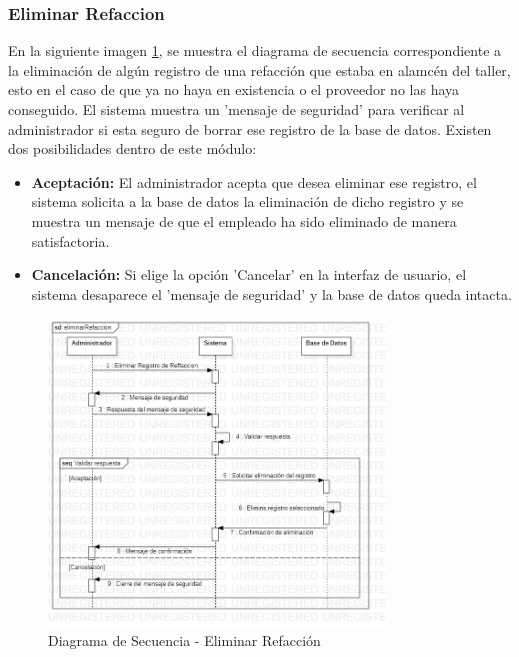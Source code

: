 \subsubsection{Eliminar Refaccion}
En la siguiente imagen \ref{fig:Diagrama de Secuencia - Eliminar Refaccion}, se muestra el diagrama de secuencia correspondiente a la eliminación de algún registro de una refacción que estaba en alamcén del taller, esto en el caso de que ya no haya en existencia o el proveedor no las haya conseguido. El sistema muestra un 'mensaje de seguridad' para verificar al administrador si esta seguro de borrar ese registro de la base de datos. Existen dos posibilidades dentro de este módulo:
\begin{itemize}
	\item \textbf{Aceptación:} El administrador acepta que desea eliminar ese registro, el sistema solicita a la base de datos la eliminación de dicho registro y se muestra un mensaje de que el empleado ha sido eliminado de manera satisfactoria.
	\item \textbf{Cancelación:} Si elige la opción 'Cancelar' en la interfaz de usuario, el sistema desaparece el 'mensaje de seguridad' y la base de datos queda intacta. 
\end{itemize}
\begin{figure}[!h]
	\centering
	\includegraphics[width=0.8\textwidth]{./diseno/vprocesos/imagenes/eliminarRefaccion}
	\caption{Diagrama de Secuencia - Eliminar Refacción}
	\label{fig:Diagrama de Secuencia - Eliminar Refaccion}
\end{figure}
\clearpage